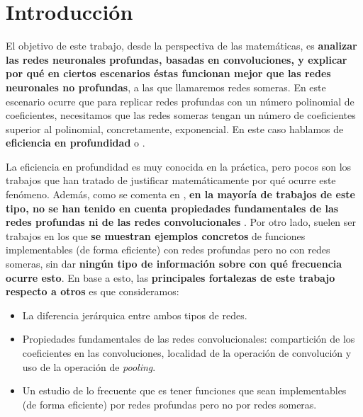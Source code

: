 \chapter{Introducción}\label{ch:introduccion}

El objetivo de este trabajo, desde la perspectiva de las matemáticas, es \textbf{analizar las redes neuronales profundas, basadas en convoluciones, y explicar por qué en ciertos escenarios éstas funcionan mejor que las redes neuronales no profundas}, a las que llamaremos redes someras. En este escenario ocurre que para replicar redes profundas con un número polinomial de coeficientes, necesitamos que las redes someras tengan un número de coeficientes superior al polinomial, concretamente, exponencial. En este caso hablamos de \textbf{eficiencia en profundidad} o \textbf{}.

La eficiencia en profundidad es muy conocida en la práctica, pero pocos son los trabajos que han tratado de justificar matemáticamente por qué ocurre este fenómeno. Además, como se comenta en \cite{matematicas:principal}, \textbf{en la mayoría de trabajos de este tipo, no se han tenido en cuenta propiedades fundamentales de las redes profundas ni de las redes convolucionales} \cite{matematicas:paper_depth_malo_01} \cite{matematicas:paper_depth_malo_02} \cite{matematicas:paper_depth_malo_03}. Por otro lado, suelen ser trabajos en los que \textbf{se muestran ejemplos concretos} de funciones implementables (de forma eficiente) con redes profundas pero no con redes someras, sin dar \textbf{ningún tipo de información sobre con qué frecuencia ocurre esto}. En base a esto, las \textbf{principales fortalezas de este trabajo respecto a otros} es que consideramos:

\begin{itemize}
	\item La diferencia jerárquica entre ambos tipos de redes.
	\item Propiedades fundamentales de las redes convolucionales: compartición de los coeficientes en las convoluciones, localidad de la operación de convolución y uso de la operación de \textit{pooling}.
	\item Un estudio de lo frecuente que es tener funciones que sean implementables (de forma eficiente) por redes profundas pero no por redes someras.
\end{itemize}

